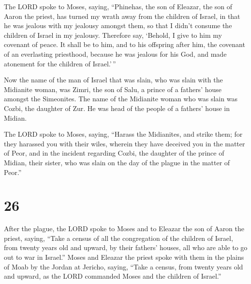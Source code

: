  The LORD spoke to Moses, saying, 
``Phinehas, the son of Eleazar, the son of Aaron the priest, has turned
my wrath away from the children of Israel, in that he was jealous with
my jealousy amongst them, so that I didn't consume the children of
Israel in my jealousy.  Therefore say, `Behold, I give to
him my covenant of peace.  It shall be to him, and to his
offspring after him, the covenant of an everlasting priesthood, because
he was jealous for his God, and made atonement for the children of
Israel.'\,''

 Now the name of the man of Israel that was slain, who
was slain with the Midianite woman, was Zimri, the son of Salu, a prince
of a fathers' house amongst the Simeonites.  The name of
the Midianite woman who was slain was Cozbi, the daughter of Zur. He was
head of the people of a fathers' house in Midian.

 The LORD spoke to Moses, saying, 
``Harass the Midianites, and strike them;  for they
harassed you with their wiles, wherein they have deceived you in the
matter of Peor, and in the incident regarding Cozbi, the daughter of the
prince of Midian, their sister, who was slain on the day of the plague
in the matter of Peor.''

\hypertarget{section-25}{%
\section{26}\label{section-25}}

 After the plague, the LORD spoke to Moses and to Eleazar
the son of Aaron the priest, saying,  ``Take a census of
all the congregation of the children of Israel, from twenty years old
and upward, by their fathers' houses, all who are able to go out to war
in Israel.''  Moses and Eleazar the priest spoke with them
in the plains of Moab by the Jordan at Jericho, saying, 
``Take a census, from twenty years old and upward, as the LORD commanded
Moses and the children of Israel.''

